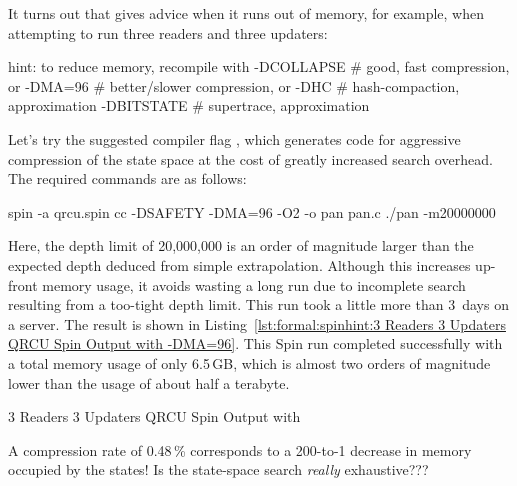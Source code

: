 It turns out that  gives advice when it runs out of memory,
for example, when attempting to run three readers and three updaters:

\begin{VerbatimU}
hint: to reduce memory, recompile with
  -DCOLLAPSE # good, fast compression, or
  -DMA=96   # better/slower compression, or
  -DHC # hash-compaction, approximation
  -DBITSTATE # supertrace, approximation
\end{VerbatimU}

Let's try the suggested compiler flag ,
which generates code for aggressive compression of the
state space at the cost of greatly increased search overhead.
The required commands are as follows:

\begin{VerbatimU}
spin -a qrcu.spin
cc -DSAFETY -DMA=96 -O2 -o pan pan.c
./pan -m20000000
\end{VerbatimU}

Here, the depth limit of 20,000,000 is an order of magnitude
larger than the expected depth deduced from simple extrapolation.
Although this increases up-front memory usage, it avoids wasting
a long run due to incomplete search resulting from a too-tight
depth limit.
This run took a little more than 3~days on a  server.
The result is shown in
Listing~\ref{lst:formal:spinhint:3 Readers 3 Updaters QRCU Spin Output with -DMA=96}.
This Spin run completed successfully with a total memory
usage of only 6.5\,GB, which is almost two orders of magnitude
lower than the  usage of about half a terabyte.

\begin{listing}
\vspace*{-9pt}
\caption{3 Readers 3 Updaters QRCU Spin Output with }
\label{lst:formal:spinhint:3 Readers 3 Updaters QRCU Spin Output with -DMA=96}
\end{listing}

\QuickQuiz{}
	A compression rate of 0.48\,\% corresponds to a 200-to-1 decrease
	in memory occupied by the states!
	Is the state-space search \emph{really} exhaustive???
 \QuickQuizEnd

